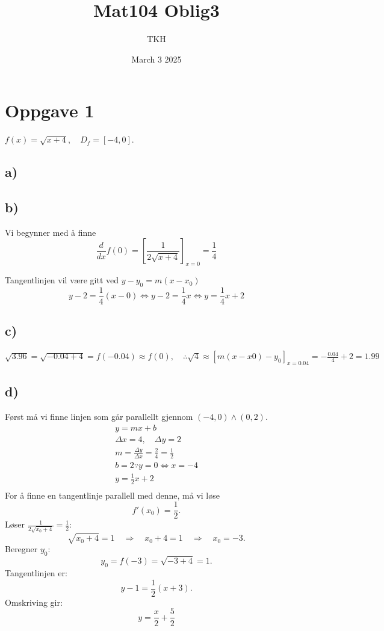 \documentclass[12pt]{article}
\title{Mat104 Oblig3}
\author{TKH}
\date{March 3 2025}
\begin{document}
\maketitle

\section*{Oppgave 1}
\(f(x) = \sqrt{x+4}, \quad D_f = [-4, 0] \).
\subsection*{a) }

\subsection*{b)}
Vi begynner med å finne
\[
\frac{d}{dx}f(0) = [\frac{1}{2\sqrt{x + 4}}]_{x=0}
= \frac{1}{4}
\]

\noindent
Tangentlinjen vil være gitt ved \(y-y_0 = m(x-x_0)\)
\[
  y-2 = \frac{1}{4}(x-0) \Leftrightarrow y-2 = \frac{1}{4}x 
  \Leftrightarrow \boxed{y=\frac{1}{4}x + 2}
\]

\subsection*{c)}
\(\sqrt{3.96} = \sqrt{-0.04 + 4} = f(-0.04) \approx f(0), 
\quad \therefore \sqrt{4} \approx [m(x-x0) - y_0]_{x = 0.04} 
= -\frac{0.04}{4} + 2 = \boxed{1.99}\)

\subsection*{d)}
Først må vi finne linjen som går parallellt gjennom \((-4, 0) \land (0, 2)\).
\begin{gather*}
  y = mx + b \\ 
  \Delta x = 4, \quad \Delta y = 2 \\ 
  m = \frac{\Delta y}{\Delta x} = \frac{2}{4} = \frac{1}{2} \\ 
  b = 2 \because y = 0 \Leftrightarrow x = -4 \\ 
  y = \frac{1}{2}x + 2 \\ 
\end{gather*}
For å finne en tangentlinje parallell med denne, må vi løse 
\[
f'(x_0) = \frac{1}{2}.
\]
Løser \( \frac{1}{2\sqrt{x_0+4}} = \frac{1}{2} \):
\[
\sqrt{x_0+4} = 1 \quad \Rightarrow \quad x_0 + 4 = 1 \quad \Rightarrow \quad x_0 = -3.
\]
Beregner \( y_0 \):
\[
y_0 = f(-3) = \sqrt{-3+4} = 1.
\]
Tangentlinjen er:
\[
y - 1 = \frac{1}{2}(x + 3).
\]
Omskriving gir:
\[
\boxed{y = \frac{x}{2} + \frac{5}{2}}
\]
\end{document}
